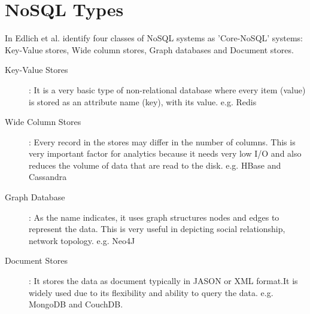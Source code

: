 \documentclass[sigconf]{acmart}
\begin{document}
\section{NoSQL Types}
In Edlich et al. identify four classes of NoSQL systems as 'Core-NoSQL' systems: Key-Value stores, Wide column stores, Graph databases and Document stores.	 \cite{edmodel}
\begin{description}

\item[Key-Value Stores]: It is a very basic type of non-relational database where every item (value) is stored as an attribute name (key), with its value. e.g. Redis

\item[Wide Column Stores]: Every record in the stores may differ in the number of columns. This is very important factor for analytics because it needs very low I/O and also reduces the volume of data that are read to the disk. e.g. HBase and Cassandra

\item[Graph Database]: As the name indicates, it uses graph structures nodes and edges to represent the data. This is very useful in depicting social relationship, network topology. e.g. Neo4J 

\item[Document Stores]: It stores the data as document typically in JASON or XML format.It is widely used due to its flexibility and ability to query the data. e.g. MongoDB and CouchDB.
\end{description}
\end{document}
